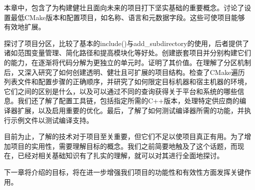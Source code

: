 本章中，包含了为构建健壮且面向未来的项目打下坚实基础的重要概念。讨论了设置最低CMake版本和配置项目，如名称、语言和元数据字段。这些可使项目能够有效地扩展。

探讨了项目分区，比较了基本的include()与add\_subdirectory的使用，后者提供了诸如范围变量管理、简化路径和提高模块化等好处。创建嵌套项目并分别构建它们的能力，在逐渐将代码分解为更独立的单元时。证明了其价值。在理解了分区机制后，又深入研究了如何创建透明、健壮且可扩展的项目结构。检查了CMake遍历列表文件和配置步骤的正确顺序，并研究了如何限定目标机器和宿主机器的环境，它们之间的区别是什么，以及可以通过不同的查询获得关于平台和系统的哪些信息。我们还了解了配置工具链，包括指定所需的C++版本，处理特定供应商的编译器扩展，以及启用重要的优化。最后，了解了如何测试编译器所需的功能，并执行示例文件以测试编译支持。

目前为止，了解的技术对于项目至关重要，但它们不足以使项目真正有用。为了增加项目的实用性，需要理解目标的概念。我们之前简要地触及了这个话题，而现在，已经对相关基础知识有了扎实的理解，就可以对其进行全面地探讨。

下一章将介绍的目标，将在进一步增强我们项目的功能性和有效性方面发挥关键作用。